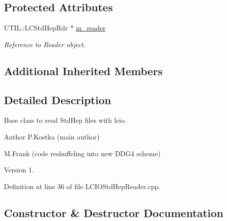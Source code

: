\subsection*{Protected Attributes}
\begin{DoxyCompactItemize}
\item 
U\+T\+I\+L\+::\+L\+C\+Std\+Hep\+Rdr $\ast$ \hyperlink{class_d_d4hep_1_1_simulation_1_1_l_c_i_o_std_hep_reader_a6545b15d1a2012ef556e97c33df91a98}{m\+\_\+reader}
\begin{DoxyCompactList}\small\item\em Reference to Reader object. \end{DoxyCompactList}\end{DoxyCompactItemize}
\subsection*{Additional Inherited Members}


\subsection{Detailed Description}
Base class to read Std\+Hep files with lcio. 

\begin{DoxyAuthor}{Author}
P.\+Kostka (main author) 

M.\+Frank (code reshuffeling into new D\+D\+G4 scheme) 
\end{DoxyAuthor}
\begin{DoxyVersion}{Version}
1. 
\end{DoxyVersion}


Definition at line 36 of file L\+C\+I\+O\+Std\+Hep\+Reader.\+cpp.



\subsection{Constructor \& Destructor Documentation}
\hypertarget{class_d_d4hep_1_1_simulation_1_1_l_c_i_o_std_hep_reader_ae877c907bf826120cc697aa80a39aba7}{}\label{class_d_d4hep_1_1_simulation_1_1_l_c_i_o_std_hep_reader_ae877c907bf826120cc697aa80a39aba7} 
